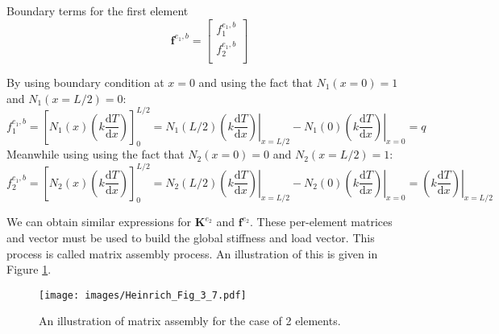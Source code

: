 \documentclass[a4paper,12pt]{article} %
\begin{document}
Boundary terms for the first element
\begin{equation}
\mathbf{f}^{e_{1},b} = \begin{bmatrix}
f^{e_{1},b}_{1} \\
f^{e_{1},b}_{2} \\
\end{bmatrix}
\end{equation}

By using boundary condition at $x=0$ and using the fact that $N_{1}(x=0)=1$
and $N_{1}(x=L/2)=0$:
\begin{equation}
f^{e_{1},b}_{1} = \left[ N_{1}(x) \left( k\frac{\mathrm{d}T}{\mathrm{d}x} \right) \right]_{0}^{L/2} =
N_{1}(L/2) \left. \left( k\frac{\mathrm{d}T}{\mathrm{d}x} \right)\right|_{x=L/2} -
N_{1}(0) \left. \left( k\frac{\mathrm{d}T}{\mathrm{d}x} \right)\right|_{x=0} = q
\end{equation}
Meanwhile using using the fact that $N_{2}(x=0)=0$
and $N_{2}(x=L/2)=1$:
\begin{equation}
f^{e_{1},b}_{2} = \left[ N_{2}(x) \left( k\frac{\mathrm{d}T}{\mathrm{d}x} \right) \right]_{0}^{L/2} =
N_{2}(L/2) \left. \left( k\frac{\mathrm{d}T}{\mathrm{d}x} \right)\right|_{x=L/2} -
N_{2}(0) \left. \left( k\frac{\mathrm{d}T}{\mathrm{d}x} \right)\right|_{x=0} =
\left. \left( k\frac{\mathrm{d}T}{\mathrm{d}x} \right)\right|_{x=L/2}
\end{equation}

We can obtain similar expressions for $\mathbf{K}^{e_{2}}$ and $\mathbf{f}^{e_2}$.
These per-element matrices and vector must be used to build the global stiffness and
load vector. This process is called matrix assembly process.
An illustration of this is given in Figure \ref{fig:assemble_2element}.

\begin{figure}[H]
{\centering
\texttt{[image: images/Heinrich\_Fig\_3\_7.pdf]}
\par}
\caption{An illustration of matrix assembly for the case of 2 elements.}
\label{fig:assemble_2element}
\end{figure}
\end{document}
